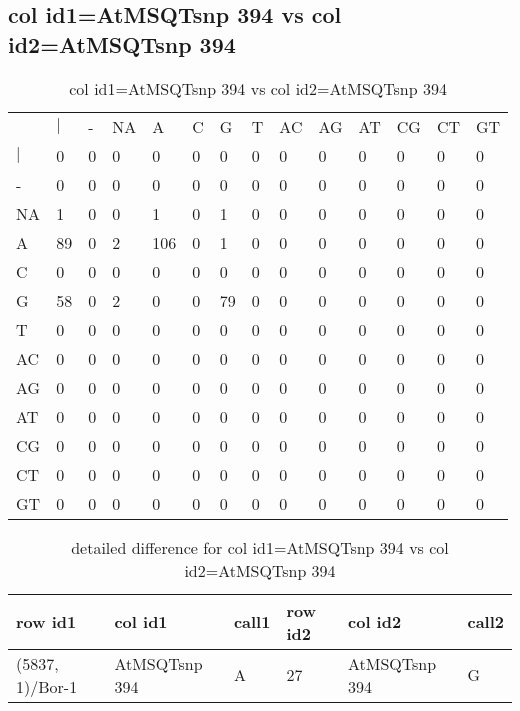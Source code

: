 \subsection{col id1=AtMSQTsnp 394 vs col id2=AtMSQTsnp 394}
\begin{center}
\begin{longtable}{|l|l|l|l|l|l|l|l|l|l|l|l|l|l|}
\caption{col id1=AtMSQTsnp 394 vs col id2=AtMSQTsnp 394} \label{table_dm900}\\
\hline
\\
\hline
&$|$&-&NA&A&C&G&T&AC&AG&AT&CG&CT&GT\\
$|$&0&0&0&0&0&0&0&0&0&0&0&0&0\\
-&0&0&0&0&0&0&0&0&0&0&0&0&0\\
NA&1&0&0&1&0&1&0&0&0&0&0&0&0\\
A&89&0&2&106&0&1&0&0&0&0&0&0&0\\
C&0&0&0&0&0&0&0&0&0&0&0&0&0\\
G&58&0&2&0&0&79&0&0&0&0&0&0&0\\
T&0&0&0&0&0&0&0&0&0&0&0&0&0\\
AC&0&0&0&0&0&0&0&0&0&0&0&0&0\\
AG&0&0&0&0&0&0&0&0&0&0&0&0&0\\
AT&0&0&0&0&0&0&0&0&0&0&0&0&0\\
CG&0&0&0&0&0&0&0&0&0&0&0&0&0\\
CT&0&0&0&0&0&0&0&0&0&0&0&0&0\\
GT&0&0&0&0&0&0&0&0&0&0&0&0&0\\
\hline
\end{longtable}
\end{center}

\begin{center}
\begin{longtable}{|l|l|l|l|l|l|}
\caption{detailed difference for col id1=AtMSQTsnp 394 vs col id2=AtMSQTsnp 394} \label{table_dm901}\\
\hline
row id1&col id1&call1&row id2&col id2&call2\\
\hline
(5837, 1)/Bor-1&AtMSQTsnp 394&A&27&AtMSQTsnp 394&G\\
\hline
\end{longtable}
\end{center}

